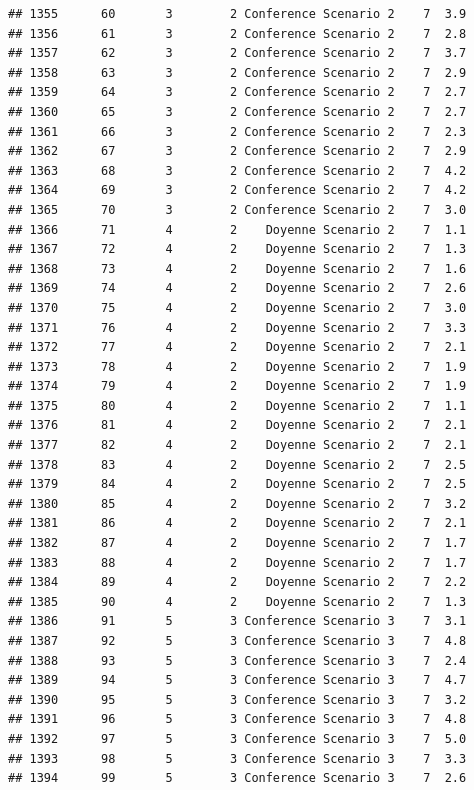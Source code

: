 \documentclass[
]{article}
\begin{document}
\begin{verbatim}
## 1355      60       3        2 Conference Scenario 2    7  3.9
## 1356      61       3        2 Conference Scenario 2    7  2.8
## 1357      62       3        2 Conference Scenario 2    7  3.7
## 1358      63       3        2 Conference Scenario 2    7  2.9
## 1359      64       3        2 Conference Scenario 2    7  2.7
## 1360      65       3        2 Conference Scenario 2    7  2.7
## 1361      66       3        2 Conference Scenario 2    7  2.3
## 1362      67       3        2 Conference Scenario 2    7  2.9
## 1363      68       3        2 Conference Scenario 2    7  4.2
## 1364      69       3        2 Conference Scenario 2    7  4.2
## 1365      70       3        2 Conference Scenario 2    7  3.0
## 1366      71       4        2    Doyenne Scenario 2    7  1.1
## 1367      72       4        2    Doyenne Scenario 2    7  1.3
## 1368      73       4        2    Doyenne Scenario 2    7  1.6
## 1369      74       4        2    Doyenne Scenario 2    7  2.6
## 1370      75       4        2    Doyenne Scenario 2    7  3.0
## 1371      76       4        2    Doyenne Scenario 2    7  3.3
## 1372      77       4        2    Doyenne Scenario 2    7  2.1
## 1373      78       4        2    Doyenne Scenario 2    7  1.9
## 1374      79       4        2    Doyenne Scenario 2    7  1.9
## 1375      80       4        2    Doyenne Scenario 2    7  1.1
## 1376      81       4        2    Doyenne Scenario 2    7  2.1
## 1377      82       4        2    Doyenne Scenario 2    7  2.1
## 1378      83       4        2    Doyenne Scenario 2    7  2.5
## 1379      84       4        2    Doyenne Scenario 2    7  2.5
## 1380      85       4        2    Doyenne Scenario 2    7  3.2
## 1381      86       4        2    Doyenne Scenario 2    7  2.1
## 1382      87       4        2    Doyenne Scenario 2    7  1.7
## 1383      88       4        2    Doyenne Scenario 2    7  1.7
## 1384      89       4        2    Doyenne Scenario 2    7  2.2
## 1385      90       4        2    Doyenne Scenario 2    7  1.3
## 1386      91       5        3 Conference Scenario 3    7  3.1
## 1387      92       5        3 Conference Scenario 3    7  4.8
## 1388      93       5        3 Conference Scenario 3    7  2.4
## 1389      94       5        3 Conference Scenario 3    7  4.7
## 1390      95       5        3 Conference Scenario 3    7  3.2
## 1391      96       5        3 Conference Scenario 3    7  4.8
## 1392      97       5        3 Conference Scenario 3    7  5.0
## 1393      98       5        3 Conference Scenario 3    7  3.3
## 1394      99       5        3 Conference Scenario 3    7  2.6

\end{verbatim}
\end{document}

